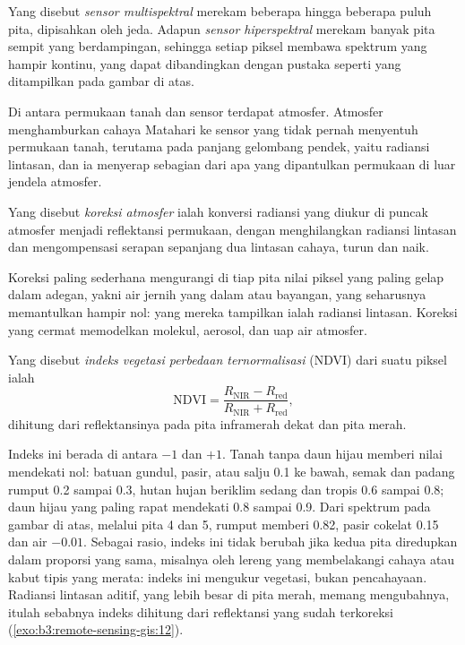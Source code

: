 \begin{definition}\label{def:b3:remote-sensing-gis:sensors}
Yang disebut \emph{sensor multispektral} merekam beberapa
hingga beberapa puluh pita, dipisahkan oleh jeda. Adapun \emph{sensor
hiperspektral} merekam banyak pita sempit yang berdampingan,
sehingga setiap piksel membawa spektrum yang hampir kontinu, yang dapat
dibandingkan dengan pustaka seperti yang ditampilkan pada gambar di atas.
\end{definition}

Di antara permukaan tanah dan sensor terdapat atmosfer. Atmosfer menghamburkan cahaya
Matahari ke sensor yang tidak pernah menyentuh permukaan tanah, terutama pada
panjang gelombang pendek, yaitu radiansi lintasan, dan ia menyerap sebagian dari apa yang
dipantulkan permukaan di luar jendela atmosfer.

\begin{definition}\label{def:b3:remote-sensing-gis:atm-correction}
Yang disebut \emph{koreksi atmosfer} ialah
konversi radiansi yang diukur di puncak atmosfer menjadi
reflektansi permukaan, dengan menghilangkan radiansi lintasan dan mengompensasi
serapan sepanjang dua lintasan cahaya, turun dan naik.
\end{definition}

Koreksi paling sederhana mengurangi di tiap pita nilai piksel yang paling
gelap dalam adegan, yakni air jernih yang dalam atau bayangan, yang seharusnya memantulkan
hampir nol: yang mereka tampilkan ialah radiansi lintasan. Koreksi yang cermat
memodelkan molekul, aerosol, dan uap air atmosfer.

\begin{definition}\label{def:b3:remote-sensing-gis:ndvi}
Yang disebut \emph{indeks vegetasi perbedaan
ternormalisasi} (NDVI) dari suatu piksel ialah
\[
\mathrm{NDVI} = \frac{R_\mathrm{NIR} - R_\mathrm{red}}{R_\mathrm{NIR} + R_\mathrm{red}} ,
\]
dihitung dari reflektansinya pada pita inframerah dekat dan pita merah.
\end{definition}

Indeks ini berada di antara $-1$ dan $+1$. Tanah tanpa daun hijau memberi nilai
mendekati nol: batuan gundul, pasir, atau salju \num{0.1} ke bawah,
semak dan padang rumput 0.2 sampai 0.3, hutan hujan beriklim sedang dan tropis 0.6 sampai
0.8; daun hijau yang paling rapat mendekati 0.8 sampai 0.9. Dari spektrum pada
gambar di atas, melalui pita 4 dan 5, rumput memberi 0.82, pasir cokelat
0.15 dan air $-0.01$. Sebagai rasio, indeks ini tidak berubah jika
kedua pita diredupkan dalam proporsi yang sama, misalnya oleh lereng yang membelakangi
cahaya atau kabut tipis yang merata: indeks ini mengukur vegetasi, bukan
pencahayaan. Radiansi lintasan aditif, yang lebih besar di pita merah, memang mengubahnya,
itulah sebabnya indeks dihitung dari reflektansi yang sudah terkoreksi
(\cref{exo:b3:remote-sensing-gis:12}).

